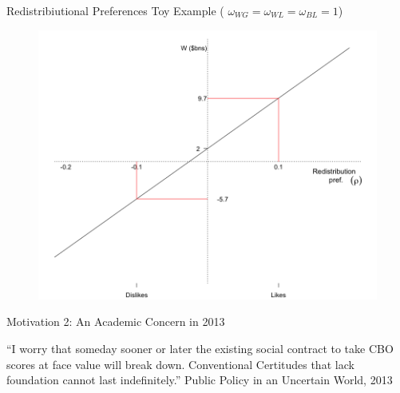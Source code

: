 \documentclass{beamer}
\begin{document}
\begin{frame}{ Redistribiutional Preferences  \linebreak \vspace*{-1em} Toy Example ({ $\omega_{WG} = \omega_{WL} = \omega_{BL} = 1$}) }

\vspace{-.2em}
\begin{figure}[h!]
\centering
\includegraphics[scale = 0.35]{../Images/sample_pref}
\label{toy_ex}
\end{figure}	
\end{frame}


\begin{frame}{Motivation 2: An Academic Concern in 2013}
\begin{exampleblock}{}
  {\large ``I worry that someday sooner or later the existing social contract to take CBO scores at face value will break down. Conventional Certitudes that lack foundation cannot last indefinitely.''
}
  \vskip3mm
   \footnotesize{ \linebreak  Public Policy in an Uncertain World, 2013} 
  	  
\end{exampleblock}
\end{frame}
\end{document}
